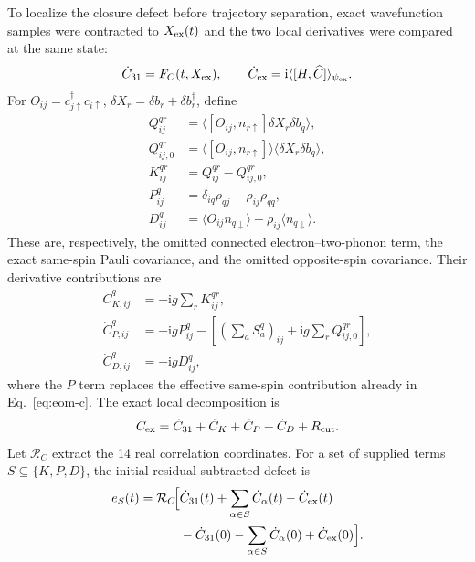 \documentclass[10pt,twocolumn]{article}
\newcommand{\ii}{\mathrm i}
\begin{document}
To localize the closure defect before trajectory separation, exact
wavefunction samples were contracted to $X_{\rm ex}(t)$ and the two local
derivatives were compared at the same state:
\begin{equation}
\dot C_{31}=F_C(t,X_{\rm ex}),\qquad
\dot C_{\rm ex}=\ii\langle[H,\widehat C]\rangle_{\psi_{\rm ex}}.
\label{eq:c-local-comparison}
\end{equation}
For $O_{ij}=c_{j\uparrow}^\dagger c_{i\uparrow}$,
$\delta X_r=\delta b_r+\delta b_r^\dagger$, define
\begin{equation}
\begin{aligned}
Q^{qr}_{ij}&=\langle[O_{ij},n_{r\uparrow}]\delta X_r\delta b_q\rangle,\\
Q^{qr}_{ij,0}&=\langle[O_{ij},n_{r\uparrow}]\rangle
\langle\delta X_r\delta b_q\rangle,\\
K^{qr}_{ij}&=Q^{qr}_{ij}-Q^{qr}_{ij,0},\\
P^q_{ij}&=\delta_{iq}\rho_{qj}-\rho_{ij}\rho_{qq},\\
D^q_{ij}&=\langle O_{ij}n_{q\downarrow}\rangle
-\rho_{ij}\langle n_{q\downarrow}\rangle.
\end{aligned}
\label{eq:kpd-definitions}
\end{equation}
These are, respectively, the omitted connected electron--two-phonon term,
the exact same-spin Pauli covariance, and the omitted opposite-spin
covariance.  Their derivative contributions are
\begin{equation}
\begin{aligned}
\dot C^q_{K,ij}&=-\ii g\sum_rK^{qr}_{ij},\\
\dot C^q_{P,ij}&=-\ii gP^q_{ij}
-\left[(\textstyle\sum_aS_a^q)_{ij}+\ii g\sum_rQ^{qr}_{ij,0}\right],\\
\dot C^q_{D,ij}&=-\ii gD^q_{ij},
\end{aligned}
\label{eq:kpd-velocities}
\end{equation}
where the $P$ term replaces the effective same-spin contribution already in
Eq.~\eqref{eq:eom-c}.  The exact local decomposition is
\begin{equation}
\dot C_{\rm ex}=\dot C_{31}+\dot C_K+\dot C_P
+\dot C_D+R_{\rm cut}.
\label{eq:c-decomposition}
\end{equation}
Let $\mathcal R_C$ extract the 14 real correlation coordinates.  For a set of
supplied terms $S\subseteq\{K,P,D\}$, the initial-residual-subtracted defect
is
{\scriptsize
\begin{equation}
\begin{aligned}
e_S(t)=\mathcal R_C\!\Bigl[&
\dot C_{31}(t)+\sum_{\alpha\in S}\dot C_\alpha(t)-\dot C_{\rm ex}(t)\\
&-\dot C_{31}(0)-\sum_{\alpha\in S}\dot C_\alpha(0)
+\dot C_{\rm ex}(0)\Bigr].
\end{aligned}
\label{eq:c-defect}
\end{equation}}
\end{document}

